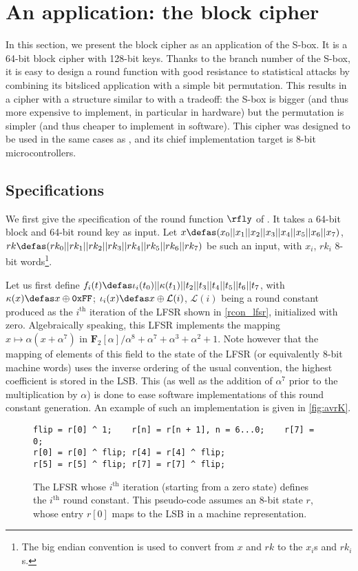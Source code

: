 \section{An application: the \littlunpride block cipher}
\label{sec:fly}

In this section, we present the \fly block cipher as an application of the \littlunOne S-box. It is a 64-bit
block cipher with 128-bit keys.
Thanks to the branch
number of the S-box, it is easy to design a round function with good resistance to statistical attacks by combining
its bitsliced application with a simple bit permutation. This results in a cipher with a structure similar to \present \cite{present}
with a tradeoff: the S-box is bigger (and thus more expensive to implement, in particular in hardware) but the
permutation is simpler (and thus cheaper to implement in software).
This cipher was designed to be used in the same cases as \pride, and its chief implementation target is 8-bit microcontrollers.

\subsection{Specifications}

We first give the specification of the round function $\rfly$ of \fly. It takes a 64-bit block and 64-bit round key as input.
Let $x \defas (x_0||x_1||x_2||x_3||x_4||x_5||x_6||x_7)$, $rk \defas (rk_0||rk_1||rk_2||rk_3||rk_4||rk_5||rk_6|| rk_7)$ be such
an input, with $x_i$, $rk_i$ 8-bit words\footnote{The big endian convention is used to convert from $x$ and $rk$ to the $x_i$s and $rk_i$s.}.

Let us first define $f_i(t) \defas \iota_i(t_0)||\kappa(t_1)||t_2||t_3||t_4||t_5||t_6||t_7$, with $\kappa(x) \defas x \oplus \texttt{0xFF}$;
$\iota_i(x) \defas x \oplus \mathcal{L}(i)$,
$\mathcal{L}(i)$ being a round constant produced as the $i^\text{th}$ iteration of the LFSR shown in
\autoref{rcon_lfsr}, initialized with zero. Algebraically speaking, this LFSR implements the mapping $x \mapsto \alpha(x + \alpha^7)$
in $\mathbf{F}_2[\alpha]/\alpha^8+\alpha^7+\alpha^3+\alpha^2+1$. Note however that the mapping of elements of this field to the state of the
LFSR (or equivalently 8-bit machine words) uses the inverse ordering of the usual convention, \ie{} the highest coefficient is
stored in the LSB. This (as well as the addition of $\alpha^7$ prior to the multiplication by $\alpha$) is done to ease software implementations
of this round constant generation. An example of such an implementation is given in 
\autoref{fig:avrK}.
\begin{figure}[ht]
\begin{verbatim}
flip = r[0] ^ 1;    r[n] = r[n + 1], n = 6...0;    r[7] = 0;
r[0] = r[0] ^ flip; r[4] = r[4] ^ flip;
r[5] = r[5] ^ flip; r[7] = r[7] ^ flip;
\end{verbatim}
\caption[The round-constant-generating LFSR.]{The LFSR whose $i^\text{th}$ iteration (starting from a zero state) defines the $i^\text{th}$ round constant. This pseudo-code
assumes an 8-bit state $r$, whose entry $r[0]$ maps to the LSB in a machine representation\label{rcon_lfsr}.}
\end{figure}

